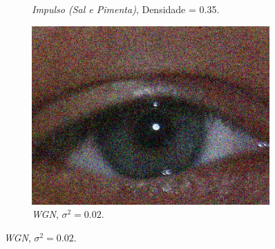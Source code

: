 \begin{figure}[H]
\begin{subfigure}{0.25\textwidth}
  \caption{\textit{Impulso (Sal e Pimenta)}, Densidade = 0.35.}
\end{subfigure}\hfil %
\begin{subfigure}{0.25\textwidth}
  \includegraphics[width=\linewidth]{img/Resultados/ruidos/wgn0,02.jpg}
  \caption{\textit{\acrshort{WGN}}, $\sigma^2 = 0.02$.}
\end{subfigure}


\end{figure}
